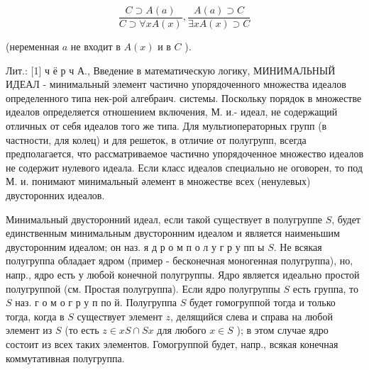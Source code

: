 \documentclass[10pt]{article}
\begin{document}
\[

\frac{C \supset A(a)}{C \supset \forall x A(x)}, \frac{A(a) \supset C}{\exists x A(x) \supset C}

\]



(неременная $a$ не входит в $A(x)$ и в $C$ ).



Лит.: [1] ч ё р ч А., Введение в математическую логику, МИНИМАЛЬНЫЙ ИДЕАЛ - минимальный элемент частично упорядоченного множества идеалов определенного типа нек-рой алгебраич. системы. Поскольку порядок в множестве идеалов определяется отношением включения, М. и.- идеал, не содержащий отличных от себя идеалов того же типа. Для мультиоператорных групп (в частности, для колец) и для решеток, в отличие от полугрупп, всегда предполагается, что рассматриваемое частично упорядоченное множество идеалов не содержит нулевого идеала. Если класс идеалов специально не оговорен, то под М. и. понимают минимальный әлемент в множестве всех (ненулевых) двусторонних идеалов.



Минимальный двусторонний идеал, если такой существует в полугруппе $S$, будет единственным минимальным двусторонним идеалом и является наименьшим двусторонним идеалом; он наз. я д р о м п о л у г р у пп ы $S$. Не всякая полугруппа обладает ядром (пример - бесконечная моногенная полугруппа), но, напр., ядро есть у любой конечной полугруппы. Ядро является идеально простой полугруппой (см. Простая полугруппа). Если ядро полугруппы $S$ есть группа, то $S$ наз. г о м о г р у п по й. Полугруппа $S$ будет гомогруппой тогда и только тогда, когда в $S$ существует элемент $z$, делящийся слева и справа на любой элемент из $S$ (то есть $z \in x S \cap S x$ для любого $x \in S$ ); в этом случае ядро состоит из всех таких элементов. Гомогруппой будет, напр., всякая конечная коммутативная полугруппа.
\end{document}
